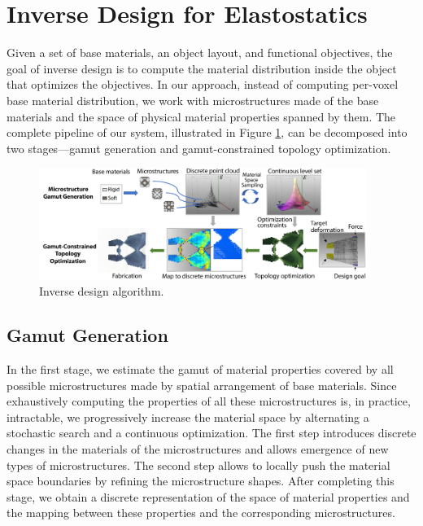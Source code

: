 \section{Inverse Design for Elastostatics}
Given a set of base materials, an object layout, and functional objectives, the goal of inverse design is to compute the material distribution inside the object that optimizes the objectives.
In our approach, instead of computing per-voxel base material distribution, we work with microstructures made of the base materials and the space of physical material properties spanned by them. The complete pipeline of our system, illustrated in Figure \ref{fig:topoptOverview}, can be decomposed into two stages---gamut generation and gamut-constrained topology optimization.
\begin{figure}[hb]
	\centering
	\includegraphics[width=0.95\textwidth]{images/topoptOverview.pdf}
	\caption{Inverse design algorithm.}
	\label{fig:topoptOverview}
\end{figure}
\subsection{Gamut Generation}
In the first stage, we estimate the gamut of material properties covered by all possible microstructures made by spatial arrangement of base materials. 
Since exhaustively computing the properties of all these microstructures is, in practice, intractable, we progressively increase the material space by alternating a stochastic search and a continuous optimization. The first step introduces discrete changes in the materials of the microstructures and allows emergence of new types of microstructures. The second step allows to locally push the material space boundaries by refining the microstructure shapes. After completing this stage, we obtain a discrete representation of the space of material properties and the mapping between these properties and the corresponding microstructures.

